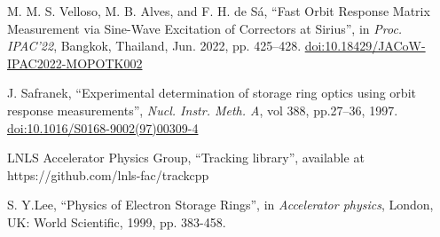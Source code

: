 \documentclass[a4paper,
               keeplastbox,   %
               ]{jacow}
\begin{document}
\begin{thebibliography}{14}
   M. M. S. Velloso, M. B. Alves, and F. H. de Sá,
   \textquotedblleft{Fast Orbit Response Matrix Measurement via Sine-Wave Excitation of Correctors at Sirius}\textquotedblright,
   in \emph{Proc. IPAC’22}, Bangkok, Thailand, Jun. 2022, pp. 425--428.
   \url{doi:10.18429/JACoW-IPAC2022-MOPOTK002}  
   
	 J. Safranek,
		\textquotedblleft{Experimental determination of storage ring optics using orbit response measurements}\textquotedblright,
		\emph{Nucl.  Instr. Meth. A}, vol 388, pp.27--36, 1997.
        \url{doi:10.1016/S0168-9002(97)00309-4}

        LNLS Accelerator Physics Group,
        \textquotedblleft{Tracking library}\textquotedblright,
        available at https://github.com/lnls-fac/trackcpp
        


        S. Y.Lee,
        \textquotedblleft{Physics of Electron Storage Rings}\textquotedblright,
        in \emph{Accelerator physics}, London, UK: World Scientific, 1999, pp. 383-458.

 






        
 
       


\end{thebibliography}
\end{document}
